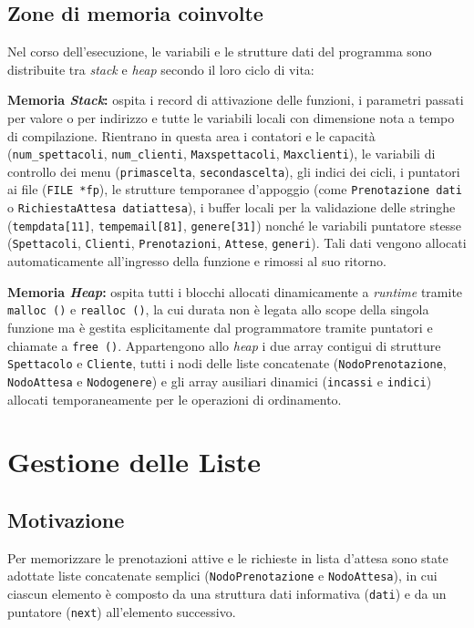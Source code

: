 \documentclass[11pt,a4paper,oneside,openany]{book}
\newenvironment{listacomp}{%
    \small
    \begin{list}{\textendash}{%
        \setlength{\topsep}{2pt}%
        \setlength{\partopsep}{0pt}%
        \setlength{\itemsep}{1pt}%
        \setlength{\parsep}{0pt}%
        \setlength{\leftmargin}{1.2em}%
    }%
}{%
    \end{list}%
}
\begin{document}
\subsection{Zone di memoria coinvolte}
Nel corso dell'esecuzione, le variabili e le strutture dati del programma sono distribuite tra \emph{stack} e \emph{heap} secondo il loro ciclo di vita:
\begin{listacomp}
    \item \textbf{Memoria \emph{Stack}:} ospita i record di attivazione delle funzioni, i parametri passati per valore o per indirizzo e tutte le variabili locali con dimensione nota a tempo di compilazione. Rientrano in questa area i contatori e le capacità (\texttt{num\_spettacoli}, \texttt{num\_clienti}, \texttt{Maxspettacoli}, \texttt{Maxclienti}), le variabili di controllo dei menu (\texttt{primascelta}, \texttt{secondascelta}), gli indici dei cicli, i puntatori ai file (\texttt{FILE *fp}), le strutture temporanee d'appoggio (come \texttt{Prenotazione dati} o \texttt{RichiestaAttesa datiattesa}), i buffer locali per la validazione delle stringhe (\texttt{tempdata[11]}, \texttt{tempemail[81]}, \texttt{genere[31]}) nonché le variabili puntatore stesse (\texttt{Spettacoli}, \texttt{Clienti}, \texttt{Prenotazioni}, \texttt{Attese}, \texttt{generi}). Tali dati vengono allocati automaticamente all'ingresso della funzione e rimossi al suo ritorno.
    \item \textbf{Memoria \emph{Heap}:} ospita tutti i blocchi allocati dinamicamente a \emph{runtime} tramite \texttt{malloc ()} e \texttt{realloc ()}, 
    la cui durata non è legata allo scope della singola funzione ma è gestita esplicitamente dal programmatore tramite puntatori e chiamate a \texttt{free ()}. 
    Appartengono allo \emph{heap} i due array contigui di strutture \texttt{Spettacolo} e \texttt{Cliente}, tutti i nodi delle liste concatenate (\texttt{NodoPrenotazione}, \texttt{NodoAttesa} e \texttt{Nodogenere}) e gli array ausiliari dinamici (\texttt{incassi} e \texttt{indici}) allocati temporaneamente per le operazioni di ordinamento.
\end{listacomp}

\section{Gestione delle Liste}

\subsection{Motivazione}
Per memorizzare le prenotazioni attive e le richieste in lista d'attesa sono state adottate liste concatenate semplici (\texttt{NodoPrenotazione} e \texttt{NodoAttesa}), in cui ciascun elemento è composto da una struttura dati informativa (\texttt{dati}) e da un puntatore (\texttt{next}) all'elemento successivo.
\end{document}
